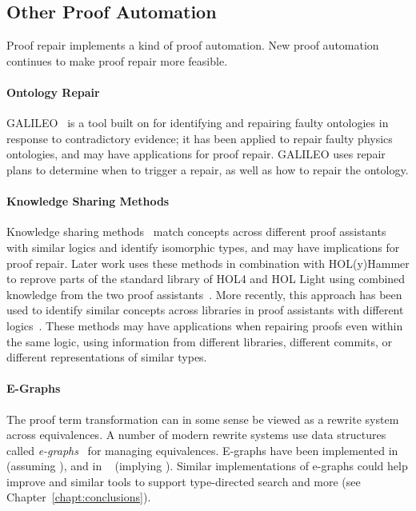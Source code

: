 \subsection{Other Proof Automation}
\label{sec:automation}

Proof repair implements a kind of proof automation.
New proof automation continues to make proof repair more feasible.

\paragraph{Ontology Repair}
GALILEO~\cite{chan2011galileo} is a tool built on  for identifying and repairing faulty ontologies in response to contradictory
evidence; it has been applied to repair faulty physics ontologies, and may have applications for proof repair.
GALILEO uses repair plans to determine when to trigger a repair, as well as how to repair the ontology.

\paragraph{Knowledge Sharing Methods}
Knowledge sharing methods~\cite{gauthier2014} match concepts across
different proof assistants with similar logics and identify isomorphic types,
and may have implications for proof repair.
Later work uses these methods in combination with HOL(y)Hammer to
reprove parts of the standard library of HOL4 and HOL Light using combined knowledge 
from the two proof assistants~\cite{Gauthier2015}. 
More recently, this approach has been used to identify similar concepts
across libraries in proof assistants with different logics~\cite{gauthier2017}.
These methods may have applications
when repairing proofs even within the same logic, using information from different 
libraries, different commits, or different representations of similar types.

\paragraph{E-Graphs} %
The \toolnamec proof term transformation can in some sense be viewed as a rewrite system across equivalences.
A number of modern rewrite systems use data structures called \textit{e-graphs}~\cite{egraph1} for managing equivalences.
E-graphs have been implemented in ~\cite{selsam:lean} (assuming ),
and in ~\cite{egraph6} (implying ).
Similar implementations of e-graphs could help improve \toolnamec and similar tools to support
type-directed search and more (see Chapter~\ref{chapt:conclusions}).

